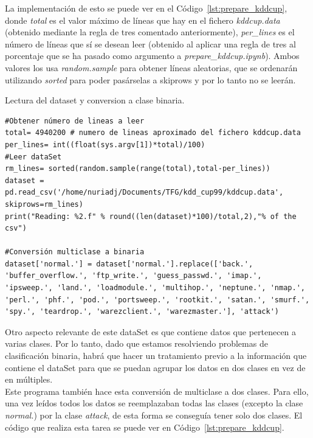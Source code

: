 \documentclass[a4paper, 12pt]{book}
\begin{document}
La implementación de esto se puede ver en el Código~\ref{lst:prepare_kddcup}, donde \textit{total} es el valor máximo de líneas que hay en el fichero \textit{kddcup.data} (obtenido mediante la regla de tres comentado anteriormente), \textit{per\_lines} es el número de líneas que sí se desean leer (obtenido al aplicar una regla de tres al porcentaje que se ha pasado como argumento a \textit{prepare\_kddcup.ipynb}). Ambos valores los usa \textit{random.sample} para obtener líneas aleatorias, que se ordenarán utilizando \textit{sorted} para poder pasárselas a skiprows y por lo tanto no se leerán. 

\begin{listing}[]
    \caption{Lectura del dataset y conversion a clase binaria.}{}
    \label{lst:prepare_kddcup}
    \begin{verbatim}
#Obtener número de lineas a leer
total= 4940200 # numero de lineas aproximado del fichero kddcup.data
per_lines= int((float(sys.argv[1])*total)/100)
#Leer dataSet
rm_lines= sorted(random.sample(range(total),total-per_lines))
dataset = pd.read_csv('/home/nuriadj/Documents/TFG/kdd_cup99/kddcup.data', skiprows=rm_lines)
print("Reading: %2.f" % round((len(dataset)*100)/total,2),"% of the csv")

#Conversión multiclase a binaria
dataset['normal.'] = dataset['normal.'].replace(['back.', 'buffer_overflow.', 'ftp_write.', 'guess_passwd.', 'imap.', 'ipsweep.', 'land.', 'loadmodule.', 'multihop.', 'neptune.', 'nmap.', 'perl.', 'phf.', 'pod.', 'portsweep.', 'rootkit.', 'satan.', 'smurf.', 'spy.', 'teardrop.', 'warezclient.', 'warezmaster.'], 'attack')
    \end{verbatim}
\end{listing}

Otro aspecto relevante de este dataSet es que contiene datos que pertenecen a varias clases. Por lo tanto, dado que estamos resolviendo problemas de clasificación binaria, habrá que hacer un tratamiento previo a la información que contiene el dataSet para que se puedan agrupar los datos en dos clases en vez de en múltiples.\\
Este programa también hace esta conversión de multiclase a dos clases. Para ello, una vez leídos todos los datos se reemplazaban todas las clases (excepto la clase \textit{normal.}) por la clase \textit{attack}\cite{MulticlassToBinary}, de esta forma se conseguía tener solo dos clases. El código que realiza esta tarea se puede ver en Código~\ref{lst:prepare_kddcup}.
\end{document}
